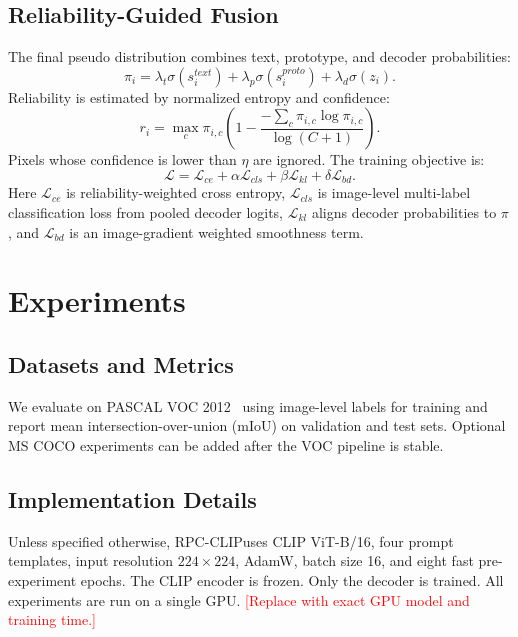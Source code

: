 \documentclass[letterpaper]{article}
\newcommand{\method}{RPC-CLIP}
\newcommand{\todo}[1]{\textcolor{red}{[#1]}}
\begin{document}
\subsection{Reliability-Guided Fusion}
The final pseudo distribution combines text, prototype, and decoder
probabilities:
\begin{equation}
\pi_i = \lambda_t \sigma(s^{text}_i) + \lambda_p \sigma(s^{proto}_i)
+ \lambda_d \sigma(z_i).
\end{equation}
Reliability is estimated by normalized entropy and confidence:
\begin{equation}
r_i = \max_c \pi_{i,c}\left(1 -
\frac{-\sum_c \pi_{i,c}\log\pi_{i,c}}{\log(C+1)}\right).
\end{equation}
Pixels whose confidence is lower than $\eta$ are ignored. The training objective
is:
\begin{equation}
\mathcal{L}= \mathcal{L}_{ce} + \alpha\mathcal{L}_{cls}
+ \beta\mathcal{L}_{kl} + \delta\mathcal{L}_{bd}.
\end{equation}
Here $\mathcal{L}_{ce}$ is reliability-weighted cross entropy,
$\mathcal{L}_{cls}$ is image-level multi-label classification loss from pooled
decoder logits, $\mathcal{L}_{kl}$ aligns decoder probabilities to $\pi$, and
$\mathcal{L}_{bd}$ is an image-gradient weighted smoothness term.

\section{Experiments}
\subsection{Datasets and Metrics}
We evaluate on PASCAL VOC 2012~\cite{voc2010} using image-level labels for
training and report mean intersection-over-union (mIoU) on validation and test
sets. Optional MS COCO experiments can be added after the VOC pipeline is
stable.

\subsection{Implementation Details}
Unless specified otherwise, \method uses CLIP ViT-B/16, four prompt templates,
input resolution $224\times224$, AdamW, batch size 16, and eight fast
pre-experiment epochs. The CLIP encoder is frozen. Only the decoder is trained.
All experiments are run on a single GPU. \todo{Replace with exact GPU model and
training time.}
\end{document}
